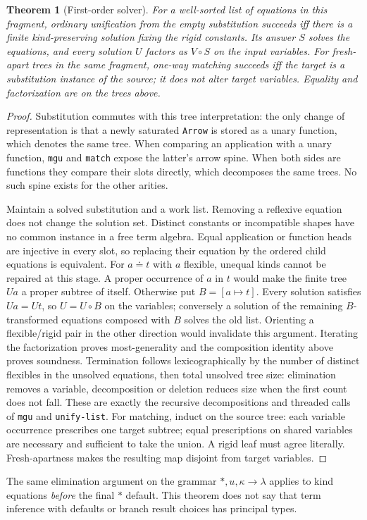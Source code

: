 \documentclass[11pt]{article}
\newtheorem{theorem}{Theorem}[section]
\theoremstyle{definition}
\newcommand{\code}[1]{\texttt{#1}}
\newcommand{\src}[1]{\nolinkurl{#1}}
\newcommand{\eqs}{\doteq}
\newcommand{\arr}{\mathbin{\to}}
\begin{document}
\begin{theorem}[First-order solver]\label{thm:mgu}
For a well-sorted list of equations in this fragment, ordinary unification
from the empty substitution succeeds iff there is a finite kind-preserving
solution fixing the rigid constants. Its answer $S$ solves the equations,
and every solution $U$ factors as $V\circ S$ on the input variables.
For fresh-apart trees in the same fragment, one-way matching succeeds
iff the target is a substitution instance of the source; it does not
alter target variables. Equality and factorization are on the trees above.
\end{theorem}
\begin{proof}
Substitution commutes with this tree interpretation: the only change of
representation is that a newly saturated \code{Arrow} is stored as a unary
function, which denotes the same tree. When comparing an application with
a unary function, \src{mgu} and \src{match} expose the latter's arrow spine.
When both sides are functions they compare their slots directly, which
decomposes the same trees. No such spine exists for the other arities.

Maintain a solved substitution and a work list. Removing a reflexive equation
does not change the solution set. Distinct constants or incompatible shapes
have no common instance in a free term algebra. Equal application or function
heads are injective in every slot, so replacing their equation by the ordered
child equations is equivalent. For $a\eqs t$ with $a$ flexible, unequal
kinds cannot be repaired at this stage. A proper occurrence of $a$ in $t$
would make the finite tree $Ua$ a proper subtree of itself. Otherwise put
$B=[a\mapsto t]$. Every solution satisfies $Ua=Ut$, so $U=U\circ B$
on the variables; conversely a solution of the remaining $B$-transformed
equations composed with $B$ solves the old list. Orienting a flexible/rigid
pair in the other direction would invalidate this argument. Iterating the
factorization proves most-generality and the composition identity above proves
soundness. Termination follows lexicographically by the number of distinct
flexibles in the unsolved equations, then total unsolved tree size:
elimination removes a variable, decomposition or deletion reduces size
when the first count does not fall. These are exactly the recursive
decompositions and threaded calls of \src{mgu} and \src{unify-list}.
For matching, induct on the source tree: each variable occurrence prescribes
one target subtree; equal prescriptions on shared variables are necessary
and sufficient to take the union. A rigid leaf must agree literally.
Fresh-apartness makes the resulting map disjoint from target variables.
\end{proof}
\noindent The same elimination argument on the grammar $*,u,\kappa\arr\lambda$
applies to kind equations \emph{before} the final $*$ default. This theorem
does not say that term inference with defaults or branch result choices has
principal types.
\end{document}
